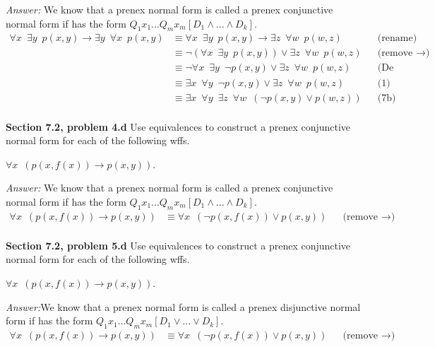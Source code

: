 \documentclass[12pt]{article}
\begin{document}
\emph{Answer:} We know that a prenex normal form is called a prenex conjunctive normal form 
if has the form $Q_1x_1...Q_m x_m[D_1 \land ...\land D_k]$.
\begin{align*}
\forall x \enspace \exists y \enspace p(x,y) \rightarrow \exists y 
\enspace \forall x \enspace p(x,y) 
    & \equiv \forall x \enspace \exists y \enspace p(x,y) \rightarrow 
      \exists z \enspace \forall w \enspace p(w,z)          && \text{(rename)} \\
    & \equiv \neg ( \forall x \enspace \exists y \enspace p(x,y)) \lor 
      \exists z \enspace \forall w \enspace p(w,z)          && \text{(remove $\rightarrow$)} \\ 
    & \equiv \neg \forall x \enspace \exists y \enspace \neg p(x,y) \lor 
      \exists z \enspace \forall w \enspace p(w,z)          && \text{(De Morgan's Laws)} \\
    & \equiv \exists x \enspace \forall y \enspace \neg p(x,y) \lor 
      \exists z \enspace \forall w \enspace p(w,z)         && \text{(1)} \\
    & \equiv \exists x \enspace \forall y \enspace \exists z \enspace 
      \forall w \enspace (\neg p(x,y) \lor p(w,z) )         && \text{(7b)} \\
\end{align*}


\textbf{Section 7.2, problem 4.d} Use equivalences to construct 
a prenex conjunctive normal form for each of the following wffs.

$\forall x \enspace (p(x,f(x)) \rightarrow p(x,y))$.

\emph{Answer:} We know that a prenex normal form is called a prenex conjunctive normal form 
if has the form $Q_1x_1...Q_m x_m[D_1 \land ...\land D_k]$.
\begin{align*}
\forall x \enspace (p(x,f(x)) \rightarrow p(x,y))
    & \equiv \forall x \enspace (\neg p(x,f(x)) \lor p(x,y))     && \text{(remove $\rightarrow$)} \\
\end{align*}


\textbf{Section 7.2, problem 5.d} Use equivalences to construct 
a prenex conjunctive normal form for each of the following wffs.

$\forall x \enspace (p(x,f(x)) \rightarrow p(x,y))$.

\emph{Answer:}We know that a prenex normal form is called a prenex disjunctive normal form 
if has the form $Q_1x_1...Q_m x_m[D_1 \lor ...\lor D_k]$.
\begin{align*}
\forall x \enspace (p(x,f(x)) \rightarrow p(x,y))
    & \equiv \forall x \enspace (\neg p(x,f(x)) \lor p(x,y))    && \text{(remove $\rightarrow$)} \\
\end{align*}
\end{document}
